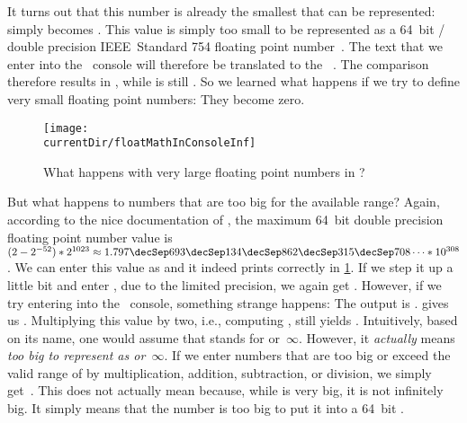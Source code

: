 It turns out that this number is already the smallest  that can be represented:
 simply becomes .
This value is simply too small to be represented as a 64~bit / double precision IEEE~Standard 754 floating point number~\cite{IEEE2019ISFFPA,H1997IS7FPN}.
The text  that we enter into the \python\ console will therefore be translated to the ~.
The comparison \pythonIdx{==} therefore results in , while  is still .
So we learned what happens if we try to define very small floating point numbers:
They become zero.

\begin{figure}%
\centering%
\texttt{[image: \\currentDir/floatMathInConsoleInf]}%
\caption{What happens with very large floating point numbers in \python?}%
\label{fig:floatMathInConsoleInf}%
\end{figure}%

But what happens to numbers that are too big for the available range?
Again, according to the nice documentation of , the maximum 64~bit double precision floating point number value is~$(2-2^{-52})*2^{1023}\approx1.797\decSep693\decSep134\decSep862\decSep315\decSep708\dots*10^{308}$.
We can enter this value as  and it indeed prints correctly in \cref{fig:floatMathInConsoleInf}.
If we step it up a little bit and enter , due to the limited precision, we again get .
However, if we try entering  into the \python\ console, something strange happens:
The output is .
 gives us .
Multiplying this value by two, i.e., computing , still yields .
Intuitively, based on its name, one would assume that  stands for  or~$\infty$.
However, it \emph{actually} means \emph{too big to represent as  or~$\infty$}.
If we enter numbers that are too big or exceed the valid range of  by multiplication, addition, subtraction, or division, we simply get~.
This does not actually mean  because, while  is very big, it is not infinitely big.
It simply means that the number is too big to put it into a 64~bit .

